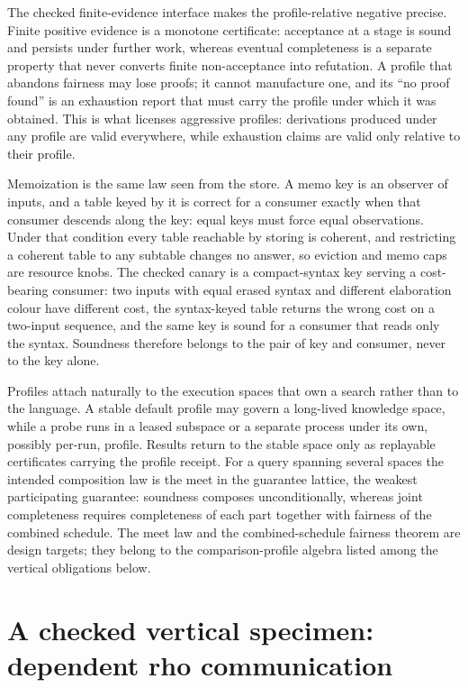 \documentclass[11pt]{article}
\theoremstyle{definition}
\theoremstyle{remark}
\begin{document}
The checked finite-evidence interface makes the profile-relative negative
precise.  Finite positive evidence is a monotone certificate: acceptance at a
stage is sound and persists under further work, whereas eventual completeness
is a separate property that never converts finite non-acceptance into
refutation.  A profile that abandons fairness may lose proofs; it cannot
manufacture one, and its ``no proof found'' is an exhaustion report that must
carry the profile under which it was obtained.  This is what licenses
aggressive profiles: derivations produced under any profile are valid
everywhere, while exhaustion claims are valid only relative to their profile.

Memoization is the same law seen from the store.  A memo key is an observer
of inputs, and a table keyed by it is correct for a consumer exactly when that
consumer descends along the key: equal keys must force equal observations.
Under that condition every table reachable by storing is coherent, and
restricting a coherent table to any subtable changes no answer, so eviction
and memo caps are resource knobs.  The checked canary is a compact-syntax key
serving a cost-bearing consumer: two inputs with equal erased syntax and
different elaboration colour have different cost, the syntax-keyed table
returns the wrong cost on a two-input sequence, and the same key is sound for
a consumer that reads only the syntax.  Soundness therefore belongs to the
pair of key and consumer, never to the key alone.

Profiles attach naturally to the execution spaces that own a search rather
than to the language.  A stable default profile may govern a long-lived
knowledge space, while a probe runs in a leased subspace or a separate process
under its own, possibly per-run, profile.  Results return to the stable space
only as replayable certificates carrying the profile receipt.  For a query
spanning several spaces the intended composition law is the meet in the
guarantee lattice, the weakest participating guarantee: soundness composes
unconditionally, whereas joint completeness requires completeness of each
part together with fairness of the combined schedule.  The meet law and the
combined-schedule fairness theorem are design targets; they belong to the
comparison-profile algebra listed among the vertical obligations below.

\section{A checked vertical specimen: dependent rho communication}
\end{document}
